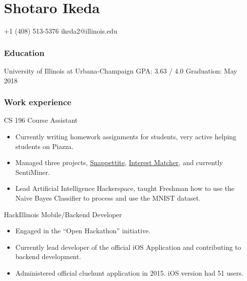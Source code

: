 \documentclass{tccv}
\begin{document}
\part{Shotaro Ikeda}

{+1 (408) 513-5376}
{ikeda2@illinois.edu}

\section{Education}

\begin{yearlist}

  {University of Illinois at  \newline Urbana-Champaign}
  {GPA: 3.63 / 4.0}
  {Graduation: May 2018}

\end{yearlist}

\section{Work experience}

\begin{eventlist}

  {CS 196}
  {Course Assistant}

  \begin{itemize}
  \item Currently writing homework assignments for students, very active helping students on Piazza.
  \item Managed three projects, \href{https://github.com/SNAPPETITE}{Snappettite}, \href{https://github.com/InterestMatcher}{Interest Matcher}, and currently SentiMiner.
  \item Lead Artificial Intelligence Hackerspace, taught Freshman how to use the Naive Bayes Classifier to process and use the MNIST dataset.
  \end{itemize}

  {HackIllinois}
  {Mobile/Backend Developer}
  \begin{itemize}
  \item Engaged in the ``Open Hackathon'' initiative.
  \item Currently lead developer of the official iOS Application and contributing to \\
    backend development.
  \item Administered official cluehunt application in 2015. iOS version had 51 users.
  \end{itemize}

\end{eventlist}
\end{document}
